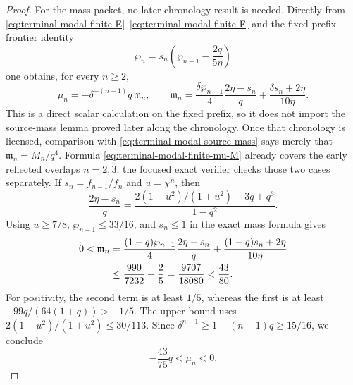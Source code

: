 \begin{proof}
For the mass packet, no later chronology result is needed.  Directly from
\eqref{eq:terminal-modal-finite-E}--\eqref{eq:terminal-modal-finite-F} and
the fixed-prefix frontier identity
\[
 \wp_n=s_n\left(\wp_{n-1}-\frac{2q}{5\eta}\right)
\]
one obtains, for every $n\ge2$,
\begin{equation}
 \mu_n=-\delta^{-(n-1)}q\,\mathfrak m_n,
 \qquad
 \mathfrak m_n=
 \frac{\delta\wp_{n-1}}4\frac{2\eta-s_n}{q}
 +\frac{\delta s_n+2\eta}{10\eta}.
 \label{eq:terminal-modal-finite-mu-M}
\end{equation}
This is a direct scalar calculation on the fixed prefix, so it does not
import the source-mass lemma proved later along the chronology.  Once that
chronology is licensed, comparison with
\eqref{eq:terminal-modal-source-mass} says merely that
$\mathfrak m_n=M_n/q^4$.  Formula
\eqref{eq:terminal-modal-finite-mu-M} already covers the early reflected
overlaps $n=2,3$; the focused exact verifier checks those two cases
separately.
If $s_n=f_{n-1}/f_n$ and $u=\chi^n$, then
\begin{equation}
 \frac{2\eta-s_n}{q}
 =\frac{2(1-u^2)/(1+u^2)-3q+q^3}{1-q^2}.
 \label{eq:terminal-modal-finite-mass-ratio}
\end{equation}
Using $u\ge7/8$, $\wp_{n-1}\le33/16$, and $s_n\le1$ in the exact mass
formula gives
\begin{align}
 0<\mathfrak m_n
 &=\frac{(1-q)\wp_{n-1}}4\frac{2\eta-s_n}{q}
 +\frac{(1-q)s_n+2\eta}{10\eta}\notag\\
 &\le\frac{990}{7232}+\frac25
 =\frac{9707}{18080}<\frac{43}{80}.
 \label{eq:terminal-modal-finite-mass-bound}
\end{align}
For positivity, the second term is at least $1/5$, whereas the first is at
least $-99q/(64(1+q))>-1/5$.  The upper bound uses
$2(1-u^2)/(1+u^2)\le30/113$.  Since
$\delta^{n-1}\ge1-(n-1)q\ge15/16$, we conclude
\begin{equation}
 -\frac{43}{75}q<\mu_n<0.
 \label{eq:terminal-modal-finite-mu-bound}
\end{equation}


\end{proof}
